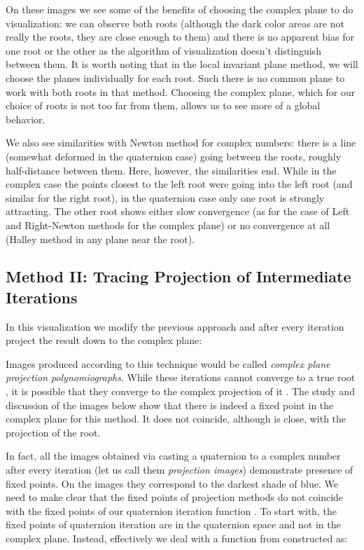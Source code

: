 \documentclass{article}
\theoremstyle{definition}
\begin{document}
On these images we see some of the benefits of choosing the complex plane to do visualization: we can observe both roots (although the dark color areas are not really the roots, they are close enough to them) and there is no apparent bias for one root or the other as the algorithm of visualization doesn't distinguish between them. It is worth noting that in the local invariant plane method, we will choose the planes individually for each root. Such there is no common plane to work with both roots in that method. Choosing the complex plane, which for our choice of roots is not too far from them, allows us to see more of a global behavior.

We also see similarities with Newton method for complex numbers: there is a line (somewhat deformed in the quaternion case) going between the roots, roughly half-distance between them. Here, however, the similarities end. While in the complex case the points closest to the left root were going into the left root (and similar for the right root), in the quaternion case only one root is strongly attracting. The other root shows either slow convergence (as for the case of Left and Right-Newton methods for the complex plane) or no convergence at all (Halley method in any plane near the root).\\

\subsection{Method II: Tracing Projection of Intermediate Iterations}
In this visualization we modify the previous approach and
after every iteration project the result down to the complex plane:

Images produced according to this technique would be called {\it complex plane projection polynomiographs}. While these iterations cannot converge to a true root , it is possible that they converge to the complex projection of it . The study and discussion of the images below show that there is indeed a fixed point in the complex plane for this method. It does not coincide, although is close, with the projection of the root.

In fact, all the images obtained via casting a quaternion to a complex number after every iteration (let us call them {\it projection images}) demonstrate presence of fixed points. On the images they correspond to the darkest shade of blue. We need to make clear that the fixed points of projection methods do not coincide with the fixed points of our quaternion iteration function . To start with, the fixed points of quaternion iteration are in the quaternion space and not in the complex plane.
Instead, effectively we deal with a function  from  constructed as:
\end{document}
